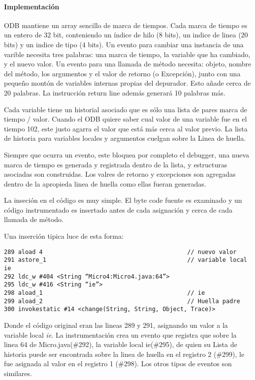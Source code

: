 \documentclass[12pt,a4paper]{report}
\begin{document}
				\paragraph{Implementación}

ODB mantiene un array sencillo de marca de tiempos.  Cada marca de tiempo es un entero de 32 bit, conteniendo un índice de hilo (8 bits), un indice de linea (20 bits) y un indice de tipo (4 bits).  Un evento para cambiar una instancia de una varible necesita tres palabras: una marca de tiempo, la variable que ha cambiado, y el nuevo valor.  Un evento para una llamada de método necesita: objeto, nombre del método, los argumentos y el valor de retorno (o Excepción), junto con una pequeño montón de variables internas propias del depurador.  Esto añade cerca de 20 palabras.  La instrucción return line además generará 10 palabras más.

Cada variable tiene un historial asociado que es sólo una lista de pares marca de tiempo / valor. Cuando el ODB quiere saber cual valor de una variable fue en el tiempo 102, este justo agarra el valor que está más cerca al valor previo.  La lista de historia para variables locales y argumentos cuelgan sobre la Linea de huella.

Siempre que ocurra un evento, este bloquea por completo el debugger, una nueva marca de tiempo es generada y registrada dentro de la lista, y estructuras asociadas son construidas.  Los valres de retorno y excepciones son agregadas dentro de la apropieda linea de huella como ellas fueran generadas.

La inseción en el código es muy simple.  El byte code fuente es examinado y un código instrumentado es insertado antes de cada asignación y cerca de cada llamada de método.

Una inserción tipica luce de esta forma:

\begin{verbatim}
289 aload 4											// nuevo valor
291 astore_1										// variable local ie
292 ldc_w #404 <String “Micro4:Micro4.java:64”>
295 ldc_w #416 <String “ie”>
298 aload_1											// ie
299 aload_2											// Huella padre
300 invokestatic #14 <change(String, String, Object, Trace)>
\end{verbatim}

Donde el código original eran las lineas 289 y 291, asignando un valor a la variable local \textit{ie}.  La instrumentación crea un evento que registra que sobre la linea 64 de Micro.java(\#292), la variable local ie(\#295), de quien su Lista de historia puede ser encontrada sobre la linea de huella en el registro 2 (\#299), le fue asignada al valor en el registro 1 (\#298).  Los otros tipos de eventos son similares.
\end{document}
